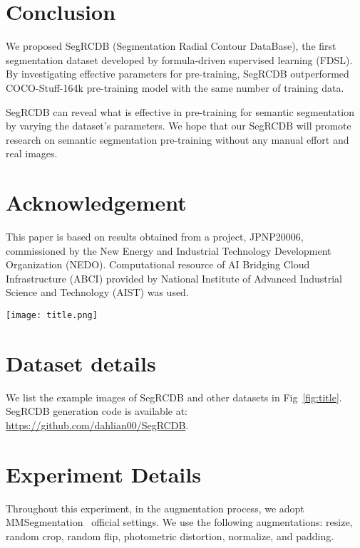 \documentclass[10pt,twocolumn,letterpaper]{article}
\begin{document}
\section{Conclusion}
We proposed SegRCDB (Segmentation Radial Contour DataBase), the first segmentation dataset developed by formula-driven supervised learning (FDSL). By investigating effective parameters for pre-training, SegRCDB outperformed COCO-Stuff-164k pre-training model with the same number of training data. 

SegRCDB can reveal what is effective in pre-training for semantic segmentation by varying the dataset's parameters. We hope that our SegRCDB will promote research on semantic segmentation pre-training without any manual effort and real images.


\section{Acknowledgement}
This paper is based on results obtained from a project,
JPNP20006, commissioned by the New Energy and Industrial Technology Development Organization (NEDO).
Computational resource of AI Bridging Cloud Infrastructure (ABCI) provided by National Institute of Advanced Industrial Science and Technology (AIST) was used. 

{\small


}

\def\figtitle{
\begin{figure*}
\centering
\texttt{[image: title.png]}
\caption{\textbf{Example images of semantic segmentation datasets.}
    The first row is the visualization of SegRCDB.
    The second row and third row are the visualization of Cityscapes~\cite{Cordts2016Cityscapes} and COCO-Stuff~\cite{https://doi.org/10.48550/arxiv.1612.03716}.
    }
\label{fig:title}
\end{figure*}
}
\clearpage
\appendix 
\figtitle
\section{Dataset details}
\label{dataset}
We list the example images of SegRCDB and other datasets in Fig~\ref{fig:title}. SegRCDB generation code is available at: \url{https://github.com/dahlian00/SegRCDB}.

\section{Experiment Details}
\label{experiment_details}
Throughout this experiment, in the augmentation process, we adopt MMSegmentation~\cite{mmseg2020} official settings. We use the following augmentations: resize, random crop, random flip, photometric distortion, normalize, and padding.  
\end{document}
